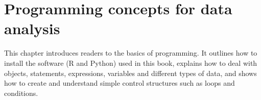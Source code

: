\chapter{Programming concepts for data analysis}

This chapter introduces readers to the basics of programming. It
outlines how to install the software (R and Python) used in this book,
explains how to deal with objects, statements, expressions, variables
and different types of data, and shows how to create and understand
simple control structures such as loops and conditions.








